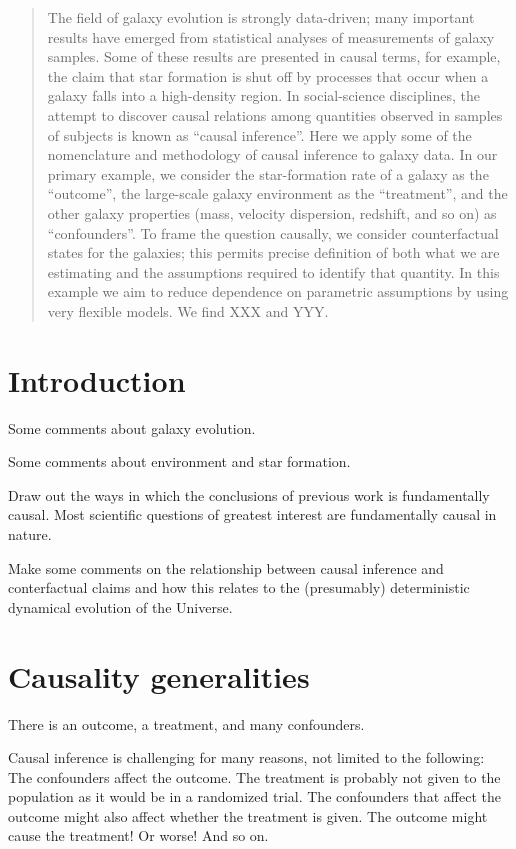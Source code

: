 \documentclass[12pt, letterpaper, preprint]{aastex}
\begin{document}
\begin{abstract}
The field of galaxy evolution is strongly data-driven; many important
results have emerged from statistical analyses of measurements of
galaxy samples.
Some of these results are presented in causal terms, for example, the
claim that star formation is shut off by processes that occur when a
galaxy falls into a high-density region.
In social-science disciplines, the attempt to discover causal
relations among quantities observed in samples of subjects is known as
``causal inference''.
Here we apply some of the nomenclature and methodology of
causal inference to galaxy data.
In our primary example, we consider the star-formation rate of a
galaxy as the ``outcome'', the large-scale galaxy environment as the
``treatment'', and the other galaxy properties (mass, velocity
dispersion, redshift, and so on) as ``confounders''.
To frame the question causally, we consider counterfactual states for
the galaxies; this permits precise definition of both what we are
estimating and the assumptions required to identify that quantity.
In this example we aim to reduce dependence on parametric assumptions
by using very flexible models.
We find XXX and YYY.
\end{abstract}

\section{Introduction}

Some comments about galaxy evolution.

Some comments about environment and star formation.

Draw out the ways in which the conclusions of previous work is fundamentally causal.
Most scientific questions of greatest interest are fundamentally causal in nature.

Make some comments on the relationship between causal inference and
conterfactual claims and how this relates to the (presumably)
deterministic dynamical evolution of the Universe.

\section{Causality generalities}

There is an outcome, a treatment, and many confounders.

Causal inference is challenging for many reasons, not limited to the following:
The confounders affect the outcome.
The treatment is probably not given to the population as it would be in a randomized trial.
The confounders that affect the outcome might also affect whether the treatment is given.
The outcome might cause the treatment!  Or worse!
And so on.
\end{document}
